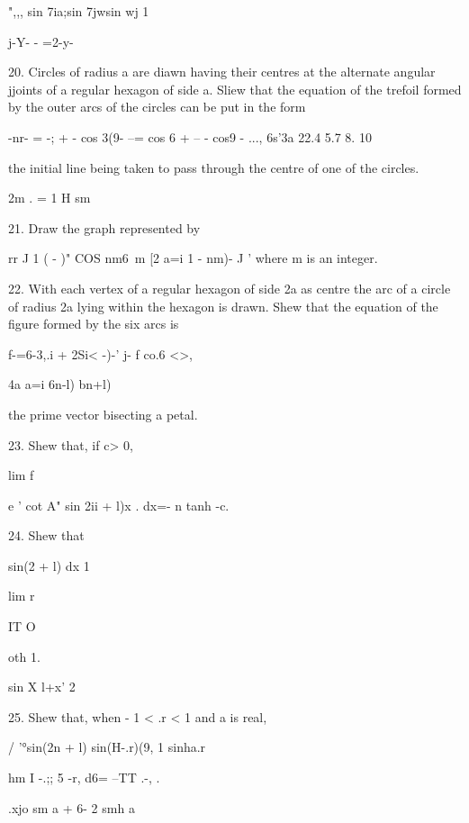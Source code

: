 ",,, sin 7ia;sin 7jwsin wj 1

 j-Y- - =2-y-


20. Circles of radius a are diawn having their centres at the
alternate angular jjoints of a regular hexagon of side a. Sliew that
the equation of the trefoil formed by the outer arcs of the circles
can be put in the form

-nr- = -; + - cos 3(9- --= cos 6 + -- - cos9 - ..., 6s'3a 22.4 5.7 8.
10

the initial line being taken to pass through the centre of one of the
circles.


2m . = 1 H sm

%
%

21. Draw the graph represented by

rr J 1 ( - )" COS nm6\ m [2 a=i 1 - nm)- J ' where m is an integer.

22. With each vertex of a regular hexagon of side 2a as centre the arc
of a circle of radius 2a lying within the hexagon is drawn. Shew that
the equation of the figure formed by the six arcs is

f-=6-3,.i + 2Si< -)-' j- f co.6 <>,

4a a=i 6n-l) bn+l)

the prime vector bisecting a petal. 

23. Shew that, if c> 0,

lim f

e ' cot A" sin 2ii + l)x . dx=- n tanh -c\pi.


24. Shew that

sin(2 + l) dx 1

lim r

IT O

oth 1.


sin X l+x' 2

25. Shew that, when - 1 < .r < 1 and a is real,

/ '°sin(2n + l) sin(H-.r)(9, 1 sinha.r

hm I -.;; 5 -r, d6= --TT .-, .

  .xjo sm a + 6- 2 smh a


